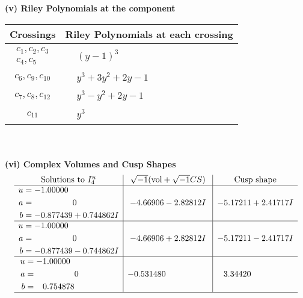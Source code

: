 \documentclass[1p]{elsarticle_modified}
\theoremstyle{definition}
\newcommand{\I}{\sqrt{-1}}
\begin{document}
\newpage\renewcommand{\arraystretch}{1}
\flushleft \textbf{(v) Riley Polynomials at the component}\newline \\
\begin{tabular}{m{50pt}|m{274pt}}
Crossings & \hspace{64pt}Riley Polynomials at each crossing \\
\hline $$\begin{aligned}c_{1},c_{2},c_{3}\\c_{4},c_{5}\end{aligned}$$&$\begin{aligned}
&(y-1)^3
\end{aligned}$\\
\hline $$\begin{aligned}c_{6},c_{9},c_{10}\end{aligned}$$&$\begin{aligned}
&y^3+3 y^2+2 y-1
\end{aligned}$\\
\hline $$\begin{aligned}c_{7},c_{8},c_{12}\end{aligned}$$&$\begin{aligned}
&y^3- y^2+2 y-1
\end{aligned}$\\
\hline $$\begin{aligned}c_{11}\end{aligned}$$&$\begin{aligned}
&y^3
\end{aligned}$\\
\hline
\end{tabular}\\~\\
\newpage\flushleft \textbf{(vi) Complex Volumes and Cusp Shapes}
$$\begin{array}{c|c|c}  
\text{Solutions to }I^u_{4}& \I (\text{vol} + \sqrt{-1}CS) & \text{Cusp shape}\\
 \hline 
\begin{aligned}
u &= -1.00000\phantom{ +0.000000I} \\
a &= \phantom{-0.000000 } 0 \\
b &= -0.877439 + 0.744862 I\end{aligned}
 & -4.66906 - 2.82812 I & -5.17211 + 2.41717 I \\ \hline\begin{aligned}
u &= -1.00000\phantom{ +0.000000I} \\
a &= \phantom{-0.000000 } 0 \\
b &= -0.877439 - 0.744862 I\end{aligned}
 & -4.66906 + 2.82812 I & -5.17211 - 2.41717 I \\ \hline\begin{aligned}
u &= -1.00000\phantom{ +0.000000I} \\
a &= \phantom{-0.000000 } 0 \\
b &= \phantom{-}0.754878\phantom{ +0.000000I}\end{aligned}
 & -0.531480\phantom{ +0.000000I} & \phantom{-}3.34420\phantom{ +0.000000I}\\
 \hline 
 \end{array}$$\newpage
\end{document}
